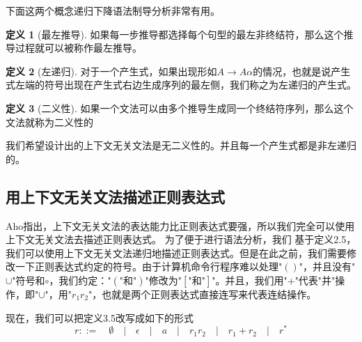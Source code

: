 \documentclass[openany,oneside]{book}
\theoremstyle{definition}
\newtheorem{definition}{\hspace{2em}定义}[chapter]
\theoremstyle{definition}
\begin{document}
 	下面这两个概念递归下降语法制导分析非常有用。
 	\begin{definition}[最左推导]
 		如果每一步推导都选择每个句型的最左非终结符，那么这个推导过程就可以被称作最左推导。
 	\end{definition}
 	\begin{definition}[左递归]
 		对于一个产生式，如果出现形如\( A \rightarrow A \alpha\)的情况，也就是说产生式左端的符号出现在产生式右边生成序列的最左侧，我们称之为左递归的产生式。
 	\end{definition}
 	\begin{definition}[二义性]
 		如果一个文法可以由多个推导生成同一个终结符序列，那么这个文法就称为二义性的
 	\end{definition}
 	我们希望设计出的上下文无关文法是无二义性的。并且每一个产生式都是非左递归的。
 	
 	
	\subsection{用上下文无关文法描述正则表达式}
	Aho\cite{2002编译原理}指出，上下文无关文法的表达能力比正则表达式要强，所以我们完全可以使用上下文无关文法去描述正则表达式。
	为了便于进行语法分析，我们
	基于定义2.5，我们可以使用上下文无关文法递归地描述正则表达式。但是在此之前，我们需要修改一下正则表达式约定的符号。由于计算机命令行程序难以处理"\(\left(\right)\)"，并且没有"\(\cup\)"符号和\(\circ\)，我们约定：\(\mbox{"}\left(\mbox{"和"}\right)\mbox{"}\)修改为\(\mbox{"}\left[  \mbox{"和"}\right]\mbox{"}\)。并且，我们用"\(+\)"代表"并"操作，即"\(\cup\)"，用"\(r_1 r_2\)"，也就是两个正则表达式直接连写来代表连结操作。
	
	现在，我们可以把定义3.5改写成如下的形式
	\begin{equation}
		r::= \quad \emptyset \quad| \quad\epsilon\quad |\quad a \quad  |\quad r_1 r_2\quad |\quad r_1 + r_2\quad | \quad r^*
	\end{equation}
	
\end{document}
